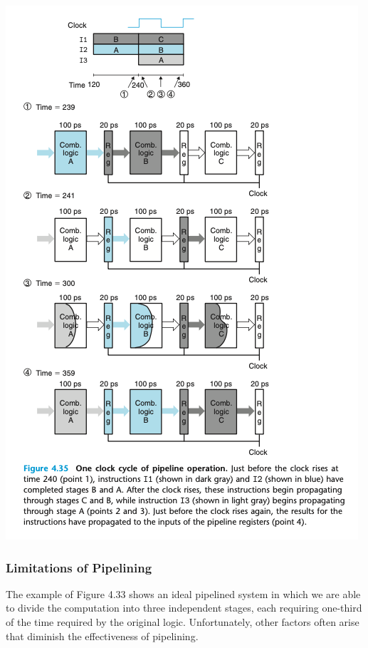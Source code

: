 \documentclass[11pt]{article}
\begin{document}
\begin{center}
\includegraphics[width=.9\linewidth]{pics/figure4.35-one-clock-of-pipeline-operation.png}
\end{center}

\subsubsection{Limitations of Pipelining}
\label{sec:orgf1c3ea2}

The example of Figure 4.33 shows an ideal pipelined system in which we are able to divide the computation into three independent stages, each requiring one-third of the time required by the original logic. Unfortunately, other factors often arise that diminish the effectiveness of pipelining.\\
\end{document}
